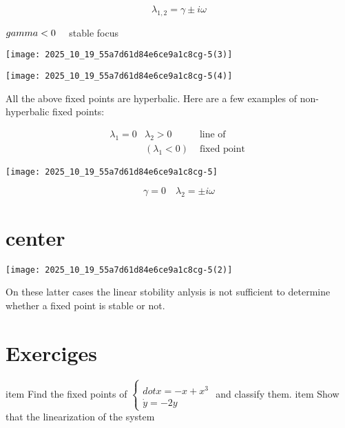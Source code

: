 $$
\lambda_{1,2}=\gamma \pm i \omega
$$

$\\gamma<0 \quad$ stable focus

\begin{center}
\texttt{[image: 2025\_10\_19\_55a7d61d84e6ce9a1c8cg-5(3)]}
\end{center}
\begin{center}
\texttt{[image: 2025\_10\_19\_55a7d61d84e6ce9a1c8cg-5(4)]}
\end{center}

All the above fixed points are hyperbalic. Here are a few examples of non-hyperbalic fixed points:

$$
\begin{array}{lll}
\lambda_{1}=0 & \lambda_{2}>0 & \text { line of } \\
& \left(\lambda_{1}<0\right) & \text { fixed point }
\end{array}
$$

\begin{center}
\texttt{[image: 2025\_10\_19\_55a7d61d84e6ce9a1c8cg-5]}
\end{center}

$$
\gamma=0 \quad \lambda_{2}= \pm i \omega
$$

\section*{center}
\begin{center}
\texttt{[image: 2025\_10\_19\_55a7d61d84e6ce9a1c8cg-5(2)]}
\end{center}

On these latter cases the linear stobility anlysis is not sufficient to determine whether a fixed point is stable or not.

\section*{Exerciges}
\begin{enumerate}
  	item Find the fixed points of $\left\{\begin{array}{l}\\dot{x}=-x+x^{3} \\ \dot{y}=-2 y\end{array}\right.$ and classify them.
  	item Show that the linearization of the system
\end{enumerate}

